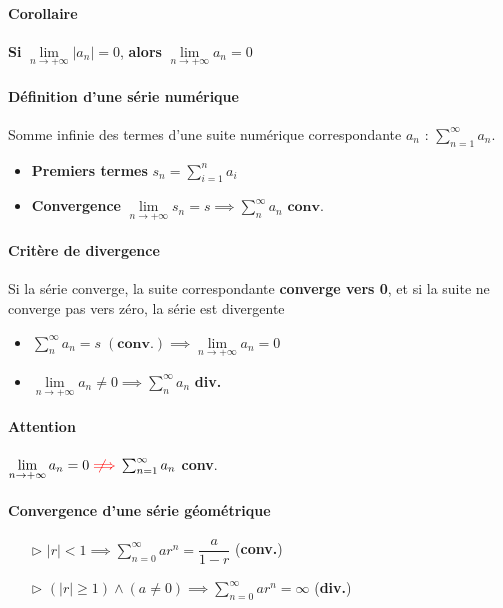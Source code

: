 \documentclass{report}
\newcommand{\notimplies}{%
  \mathrel{{\ooalign{\hidewidth$\not\phantom{=}$\hidewidth\cr$\implies$}}}}
\begin{document}
\begin{multicols*}{3}
    \paragraph{Corollaire}
         \textbf{Si} $\lim\limits_{n\to+\infty }|a_n|  = 0$, 
         \textbf{alors}      
         $\lim\limits_{n\to+\infty }a_n  = 0$

    \paragraph{Définition d'une série numérique}
    Somme infinie des termes d'une suite numérique 
    correspondante $a_n$ : 
    $\sum_{n=1}^{\infty}a_n$. 
    \begin{itemize}
        \item \textbf{Premiers termes} $s_n = \sum_{i=1}^{n } a_i$   
        \item \textbf{Convergence}   
        $\lim\limits_{n\to+\infty }s_n  = s \implies 
        \sum_{n}^{\infty}a_n \textbf{ conv.}$
    \end{itemize}



    \paragraph{Critère de divergence}
        Si la série converge, la suite correspondante 
        \textbf{converge vers 0},
        et si la suite ne converge pas vers zéro, la série 
            est divergente
        \begin{itemize} 
            \item $\sum_ {n}^{ \infty }a_n = s \; (\textbf{conv.}) 
                \implies 
            \lim\limits_{n\to+\infty }a_n  = 0$
            \item
            $\lim\limits_{n\to+\infty }a_n  \neq 0  
            \implies 
            \sum_{ n}^{\infty }a_n$ \textbf{ div.}  
        \end{itemize}

    \paragraph{Attention} 
    $\lim\limits_{n\to+\infty }a_n = 0 
    \textcolor{red}{\notimplies} 
    \sum_{n=1}^{\infty }a_n$ \textbf{conv}.   



    \paragraph{Convergence d'une série géométrique}
    \begin{itemize}
        \item[$\rhd$] 
            $|r| < 1 \implies  
            \sum_{n=0}^{\infty }ar^{n} = 
            \dfrac{a}{1 - r} $ \;\;(\textbf{conv.})  
        \item [$\rhd$] 
            $(|r| \geq 1) \land (a \neq 0) \implies 
            \sum_{n=0}^{\infty }ar^{n} = \infty$ 
            (\textbf{div.})
        

\end{itemize}
\end{multicols*}
\end{document}
